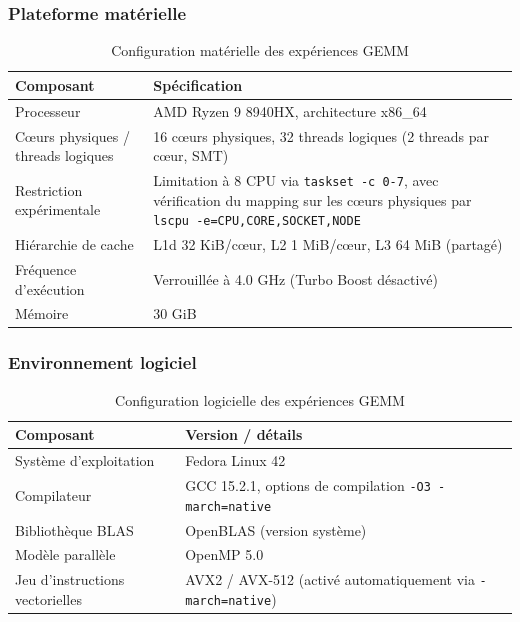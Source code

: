 \documentclass[a4paper,11pt,oneside]{article}
\begin{document}
\subsubsection{Plateforme matérielle}

\begin{table}[H]
\centering
\begin{tabular}{p{}p{}}
\toprule
\textbf{Composant} & \textbf{Spécification} \\
\midrule
Processeur & AMD Ryzen 9 8940HX, architecture x86\_64 \\
Cœurs physiques / threads logiques & 16 cœurs physiques, 32 threads logiques (2 threads par cœur, SMT)\\
Restriction expérimentale & Limitation à 8 CPU via \texttt{taskset -c 0-7}, avec vérification du mapping sur les cœurs physiques par \texttt{lscpu -e=CPU,CORE,SOCKET,NODE} \\
Hiérarchie de cache & L1d 32 KiB/cœur, L2 1 MiB/cœur, L3 64 MiB (partagé)\\
Fréquence d'exécution & Verrouillée à 4.0 GHz (Turbo Boost désactivé)\\
Mémoire & 30 GiB \\
\bottomrule
\end{tabular}
\caption{Configuration matérielle des expériences GEMM}
\label{tab:gemm_hardware}
\end{table}

\subsubsection{Environnement logiciel}

\begin{table}[H]
\centering
\begin{tabular}{p{}p{}}
\toprule
\textbf{Composant} & \textbf{Version / détails} \\
\midrule
Système d'exploitation & Fedora Linux 42 \\
Compilateur & GCC 15.2.1, options de compilation \texttt{-O3 -march=native} \\
Bibliothèque BLAS & OpenBLAS (version système)\\
Modèle parallèle & OpenMP 5.0 \\
Jeu d'instructions vectorielles & AVX2 / AVX-512 (activé automatiquement via \texttt{-march=native})\\
\bottomrule
\end{tabular}
\caption{Configuration logicielle des expériences GEMM}
\label{tab:gemm_software}
\end{table}
\end{document}
